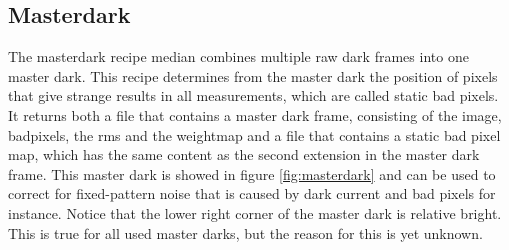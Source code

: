 \documentclass[twoside,single]{lion-msc}
\begin{document}
\subsection{Masterdark}
The masterdark recipe median combines multiple raw dark frames into one master dark. This recipe determines from the master dark the position of pixels that give strange results in all measurements, which are called static bad pixels. It returns both a file that contains a master dark frame, consisting of the image, badpixels, the rms and the weightmap and a file that contains a static bad pixel map, which has the same content as the second extension in the master dark frame. This master dark is showed in figure \ref{fig:masterdark} and can be used to correct for fixed-pattern noise that is caused by dark current and bad pixels for instance. Notice that the lower right corner of the master dark is relative bright. This is true for all used master darks, but the reason for this is yet unknown.
\end{document}
